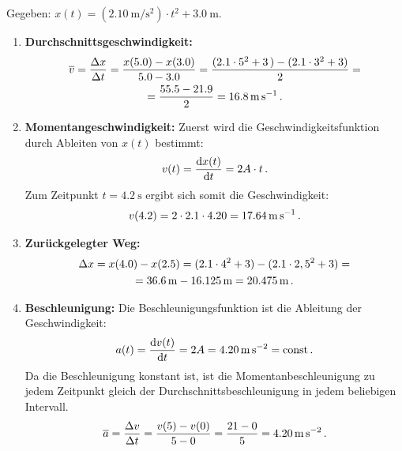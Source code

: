 \documentclass[ngerman]{scrreprt}
\newenvironment{loesungbox}[1]
  {\needspace{5\baselineskip}\begin{loesungboxstyle}[frametitle={#1}]}
  {\end{loesungboxstyle}}
\begin{document}
\begin{loesungbox}{Lösung zu \Cref{aufg:rakete}}
Gegeben: $x(t) = (\SI{2,10}{\meter\per\second\squared}) \cdot t^2 + \SI{3,0}{\meter}$.
\begin{enumerate}
    \item \textbf{Durchschnittsgeschwindigkeit:}
    \begin{multline}
        \overline{v} = \frac{\Delta x}{\Delta t} = \frac{x(\num{5,0})-x(\num{3,0})}{\num{5,0}-\num{3,0}} = \frac{(\num{2,1}\cdot 5^2+\SI{3}) - (\num{2,1}\cdot 3^2 + \num{3})}{\num{2}} = \\
        = \frac{\num{55,5} - \num{21,9}}{\num{2}} = \SI{16,8}{\meter\per\second} \,.
    \end{multline}
    
    \item \textbf{Momentangeschwindigkeit:}
    Zuerst wird die Geschwindigkeitsfunktion durch Ableiten von $x(t)$ bestimmt:
    \begin{equation}
        v(t) = \frac{\mathrm{d} x(t)}{\mathrm{d} t} = 2A\cdot t \,.
    \end{equation}
    Zum Zeitpunkt $t = \SI{4,2}{\second}$ ergibt sich somit die Geschwindigkeit:
    \begin{equation}
        v(\num{4,2}) = 2 \cdot \num{2,1} \cdot \num{4,20} = \SI{17,64}{\meter\per\second} \,.
    \end{equation}
    
    \item \textbf{Zurückgelegter Weg:}
    \begin{multline}
        \Delta x = x(\num{4,0}) - x(\num{2,5}) = (\num{2,1} \cdot 4^2 + \num{3}) - (\num{2,1}\cdot 2,5^2 + \num{3}) = \\
        = \SI{36,6}{\meter} - \SI{16,125}{\meter} = \SI{20,475}{\meter} \,.
    \end{multline}
    
    \item \textbf{Beschleunigung:}
    Die Beschleunigungsfunktion ist die Ableitung der Geschwindigkeit:
    \begin{equation}
        a(t) = \frac{\mathrm{d} v(t)}{\mathrm{d} t} = 2A = \SI{4,20}{\meter\per\second\squared} = \mathrm{const} \,.
    \end{equation}
    Da die Beschleunigung konstant ist, ist die Momentanbeschleunigung zu jedem Zeitpunkt gleich der Durchschnittsbeschleunigung in jedem beliebigen Intervall.
    \begin{equation}
        \overline{a} = \frac{\Delta v}{\Delta t} = \frac{v(\num{5}) - v(\num{0})}{\num{5} - \num{0}} = \frac{\num{21} - \num{0}}{\num{5}} = \SI{4,20}{\meter\per\second\squared} \,.
    \end{equation}
\end{enumerate}
\end{loesungbox}
\end{document}
